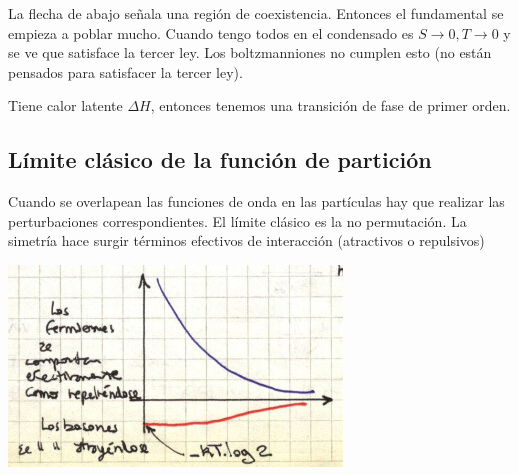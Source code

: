 \documentclass[10pt,oneside]{CBFT_book}
\begin{document}
La flecha de abajo señala una región de coexistencia. Entonces el fundamental se empieza a poblar mucho.
Cuando tengo todos en el condensado es $ S \to 0, T \to 0$ y se ve que satisface la tercer ley.
Los boltzmanniones no cumplen esto (no están pensados para satisfacer la tercer ley).

Tiene calor latente $ \Delta H $, entonces tenemos una transición de fase de primer orden.

\subsection{Límite clásico de la función de partición}

Cuando se overlapean las funciones de onda en las partículas hay que realizar las perturbaciones 
correspondientes.
El límite clásico es la no permutación. La simetría hace surgir términos efectivos de interacción
(atractivos o repulsivos)

\includegraphics[scale=0.5]{images/1606329560.jpg}
\end{document}
